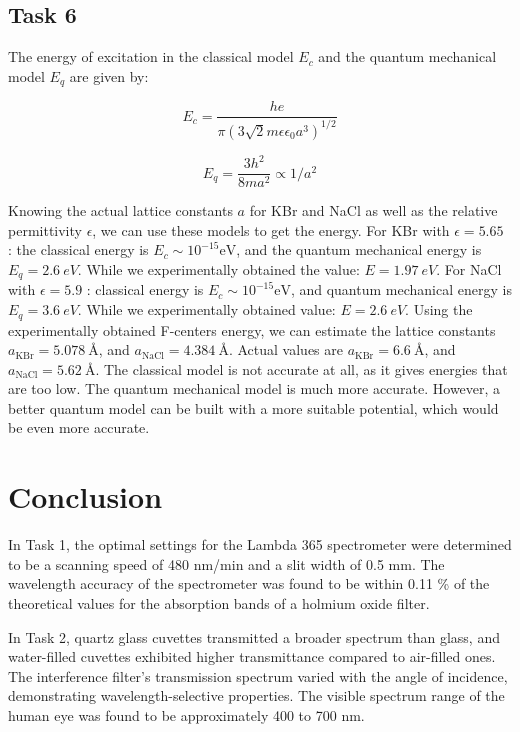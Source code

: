 \documentclass{article}
\begin{document}
\pagebreak{}

\subsection{Task 6}

The energy of excitation in the classical model $E_c$ and the quantum mechanical model $E_q$ are given by:

\begin{equation}
    E_c=\frac{h e}{\pi\left(3 \sqrt{2} m \epsilon \epsilon_0 a^3\right)^{1 / 2}}
\end{equation}

\begin{equation}
    E_q=\frac{3 h^2}{8 m a^2} \propto 1 / a^2
\end{equation}


Knowing the actual lattice constants $a$ for KBr and NaCl as well as the relative permittivity $\epsilon$, we can use these models to get the energy. For KBr with $\epsilon=5.65$ : the classical energy is $E_c \sim 10^{-15} \text{eV}$, and the quantum mechanical energy is $E_q=\SI{2.6}{eV}$. While we experimentally obtained the value: $E= \SI{1.97}{eV}$. For NaCl with $\epsilon=5.9$ : classical energy is $E_c \sim 10^{-15} \text{eV}$, and quantum mechanical energy is $E_q= \SI{3.6}{eV}$. While we experimentally obtained value: $E= \SI{2.6}{eV}$.
Using the experimentally obtained F-centers energy, we can estimate the lattice constants $a_{\text{KBr}}=\SI{5.078}{\angstrom} $, and $a_{\text{NaCl}}=\SI{4.384}{\angstrom}$. Actual values are $a_{\text{KBr}}=\SI{6.6}{\angstrom} $, and $a_{\text{NaCl}}=\SI{5.62}{\angstrom}$. The classical model is not accurate at all, as it gives energies that are too low. The quantum mechanical model is much more accurate. However, a better quantum model can be built with a more suitable potential, which would be even more accurate.

\pagebreak{}

\section{Conclusion}

In Task 1, the optimal settings for the Lambda 365 spectrometer were determined to be a scanning speed of 480 nm/min and a slit width of 0.5 mm. The wavelength accuracy of the spectrometer was found to be within 0.11 \% of the theoretical values for the absorption bands of a holmium oxide filter.

In Task 2, quartz glass cuvettes transmitted a broader spectrum than glass, and water-filled cuvettes exhibited higher transmittance compared to air-filled ones. The interference filter’s transmission spectrum varied with the angle of incidence, demonstrating wavelength-selective properties. The visible spectrum range of the human eye was found to be approximately 400 to 700 nm.
\end{document}
